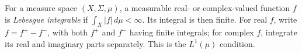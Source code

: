 
For a measure space $(X,\Sigma,\mu)$, a measurable real- or complex-valued function $f$ is \emph{Lebesgue integrable} if $\int_X|f|\,d\mu<\infty$. Its integral is then finite. For real $f$, write $f=f^+-f^-$, with both $f^+$ and $f^-$ having finite integrals; for complex $f$, integrate its real and imaginary parts separately. This is the $L^1(\mu)$ condition.

